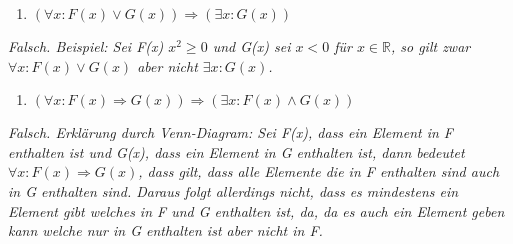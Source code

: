 \begin{enumerate}[label={d)}, leftmargin=*]
\item $(\forall x : F(x) \lor G(x)) \Rightarrow (\exists x : G(x))$
\end{enumerate}

\textit{Falsch. Beispiel: Sei F(x) $x^2 \geq 0$ und G(x) sei $x < 0$ für $x \in \mathbb{R}$, so gilt zwar $\forall x : F(x) \lor G(x)$ aber nicht $\exists x : G(x)$.}

\newpage

\begin{enumerate}[label={e)}, leftmargin=*]
\item $(\forall x : F(x) \Rightarrow G(x)) \Rightarrow (\exists x : F(x) \land G(x))$
\end{enumerate}

\textit{Falsch. Erklärung durch Venn-Diagram: Sei F(x), dass ein Element in F enthalten ist und G(x), dass ein Element in G enthalten ist, dann bedeutet $\forall x : F(x) \Rightarrow G(x)$, dass gilt, dass alle Elemente die in F enthalten sind auch in G enthalten sind. Daraus folgt allerdings nicht, dass es mindestens ein Element gibt welches in F und G enthalten ist, da, da es auch ein Element geben kann welche nur in G enthalten ist aber nicht in F.}

\begin{center}
\end{center}